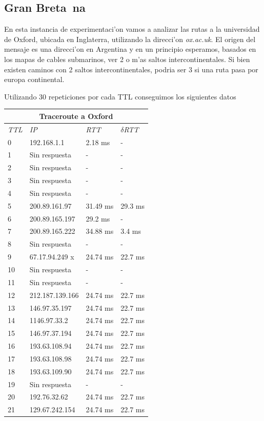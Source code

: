 \subsection{Gran Breta~na}
En esta instancia de experimentaci'on vamos a analizar las rutas a la universidad de Oxford, ubicada en Inglaterra, utilizando la direcci'on \textit{ox.ac.uk}. 
El origen del mensaje es una direcci'on en Argentina y en un principio esperamos, basados en los mapas de cables submarinos, ver 2 o m'as saltos intercontinentales. Si bien
existen caminos con 2 saltos intercontinentales, podria ser 3 si una ruta pasa por europa continental. 

Utilizando 30 repeticiones por cada TTL conseguimos los siguientes datos


\begin{tabular}{ |p{2cm}||p{3cm}|p{3cm}|p{3cm}|  }
 \hline
 \multicolumn{4}{|c|}{Traceroute a Oxford} \\
 \hline
 \textit{TTL} & \textit{IP}  & \textit{RTT} & $\delta$\textit{RTT} \\
 \hline
 0   & 192.168.1.1   & 2.18 ms &   -\\
 1   & Sin respuesta  & - &   -\\
 2   & Sin respuesta  & - &   -\\
 3   & Sin respuesta  & - &   -\\
 4   & Sin respuesta   & - &   -\\
 5   & 200.89.161.97  & 31.49 ms &  29.3 ms\\
 6   & 200.89.165.197  & 29.2 ms &  - \\
 7   & 200.89.165.222  & 34.88 ms &  3.4 ms\\
 8   & Sin respuesta  & - &   -\\
 9   & 67.17.94.249 x & 24.74 ms &  22.7 ms\\
 10   & Sin respuesta   & - &   -\\
 11   & Sin respuesta   & - &   -\\
 12   & 212.187.139.166  & 24.74 ms &  22.7 ms\\
 13   & 146.97.35.197   & 24.74 ms &  22.7 ms\\
 14   & 1146.97.33.2  & 24.74 ms &  22.7 ms\\
 15   & 146.97.37.194   & 24.74 ms &  22.7 ms\\
 16   & 193.63.108.94   & 24.74 ms &  22.7 ms\\
 17   & 193.63.108.98   & 24.74 ms &  22.7 ms\\
 18   & 193.63.109.90   & 24.74 ms &  22.7 ms\\
 19   & Sin respuesta   & - &   -\\
 20   & 192.76.32.62   & 24.74 ms &  22.7 ms\\
 21   & 129.67.242.154   & 24.74 ms &  22.7 ms\\
 \hline
\end{tabular}


